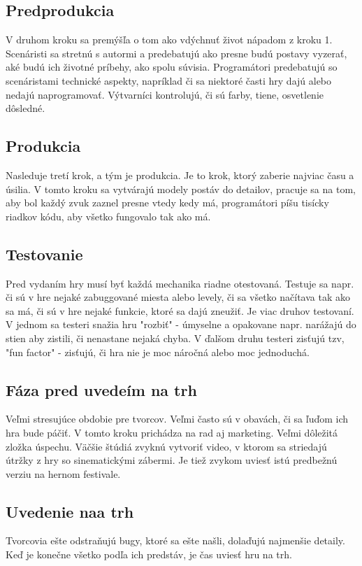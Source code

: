 \documentclass[10pt,twoside,slovak,a4paper]{article}
\begin{document}
\subsection{Predprodukcia}
V druhom kroku sa premýšľa o tom ako vdýchnuť život nápadom z kroku 1. Scenáristi sa stretnú s autormi a predebatujú ako presne budú postavy vyzerať, aké budú ich životné príbehy, ako spolu súvisia. Programátori predebatujú so scenáristami technické aspekty, napríklad či sa niektoré časti hry dajú alebo nedajú naprogramovať. Výtvarníci kontrolujú, či sú farby, tiene, osvetlenie dôsledné. 

\subsection{Produkcia}
Nasleduje tretí krok, a tým je produkcia. Je to krok, ktorý zaberie najviac času a úsilia. V tomto kroku sa vytvárajú modely postáv do detailov, pracuje sa na tom, aby bol každý zvuk zaznel presne vtedy kedy má, programátori píšu tisícky riadkov kódu, aby všetko fungovalo tak ako má. 

\subsection{Testovanie}
Pred vydaním hry musí byť každá mechanika riadne otestovaná. Testuje sa napr. či sú v hre nejaké zabuggované miesta alebo levely, či sa všetko načítava tak ako sa má, či sú v hre nejaké funkcie, ktoré sa dajú zneužiť. Je viac druhov testovaní. V jednom sa testeri snažia hru "rozbiť" - úmyselne a opakovane napr. narážajú do stien aby zistili, či nenastane nejaká chyba. V ďalšom druhu testeri zisťujú tzv, "fun factor" - zisťujú, či hra nie je moc náročná alebo moc jednoduchá.

\subsection{Fáza pred uvedeím na trh}
Veľmi stresujúce obdobie pre tvorcov. Veľmi často sú v obavách, či sa ľuďom ich hra bude páčiť. V tomto kroku prichádza na rad aj marketing. Veľmi dôležitá zložka úspechu. Väčšie štúdiá zvyknú vytvoriť video, v ktorom sa striedajú útržky z hry so sinematickými zábermi. Je tiež zvykom uviesť istú predbežnú verziu na hernom festivale.

\subsection{Uvedenie naa trh}
Tvorcovia ešte odstraňujú bugy, ktoré sa ešte našli, dolaďujú najmenšie detaily. Keď je konečne všetko podľa ich predstáv, je čas uviesť hru na trh.
\end{document}
